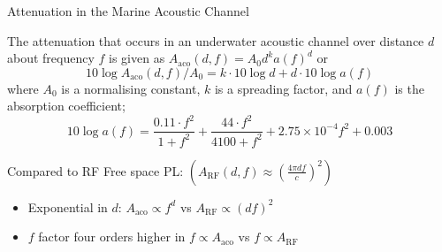 \documentclass[aspectratio=169]{beamer}
\begin{document}
\begin{frame}{Attenuation in the Marine Acoustic Channel}

  The attenuation that occurs in an underwater acoustic channel over distance $d$ about frequency $f$ is given as $A_{\text{aco}}(d,f) = A_0d^ka(f)^d$ or
  \begin{equation}
    \label{eq:acoattenuationdb}
    10 \log A_{\text{aco}}(d,f)/A_0 = k \cdot 10 \log d + d \cdot 10 \log a(f)
  \end{equation}
  where $A_0$ is a normalising constant, $k$ is a spreading factor, and $a(f)$ is the absorption coefficient\autocite{Stefanov2011};
  \begin{equation}
    \label{eq:thorp}
    10 \log a(f) = \frac{0.11 \cdot f^2}{1+f^2} + \frac{44\cdot f^2}{4100+f^2}+ 2.75\times10^{-4} f^2 + 0.003
  \end{equation}

  \pause

  Compared to RF Free space PL: $(A_{\text{RF}}(d,f) \approx \left( \frac{4\pi d f}{c} \right)^2)$
  \begin{itemize}
    \item \alert{Exponential} in $d$: $A_{\text{aco}} \propto f^{d}$ vs $A_{\text{RF}} \propto (df)^2$
    \item $f$ factor \alert{four orders higher} in $f\propto A_{\text{aco}}$ vs $f\propto A_{\text{RF}}$

  \end{itemize}

\end{frame}
\end{document}
